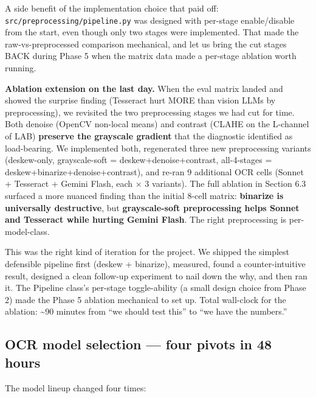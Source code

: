 \documentclass[
  letterpaper,
  DIV=11,
  numbers=noendperiod]{scrartcl}
\begin{document}
A side benefit of the implementation choice that paid off:
\texttt{src/preprocessing/pipeline.py} was designed with per-stage
enable/disable from the start, even though only two stages were
implemented. That made the raw-vs-preprocessed comparison mechanical,
and let us bring the cut stages BACK during Phase 5 when the matrix data
made a per-stage ablation worth running.

\textbf{Ablation extension on the last day.} When the eval matrix landed
and showed the surprise finding (Tesseract hurt MORE than vision LLMs by
preprocessing), we revisited the two preprocessing stages we had cut for
time. Both denoise (OpenCV non-local means) and contrast (CLAHE on the
L-channel of LAB) \textbf{preserve the grayscale gradient} that the
diagnostic identified as load-bearing. We implemented both, regenerated
three new preprocessing variants (deskew-only, grayscale-soft =
deskew+denoise+contrast, all-4-stages =
deskew+binarize+denoise+contrast), and re-ran 9 additional OCR cells
(Sonnet + Tesseract + Gemini Flash, each × 3 variants). The full
ablation in Section 6.3 surfaced a more nuanced finding than the initial
8-cell matrix: \textbf{binarize is universally destructive}, but
\textbf{grayscale-soft preprocessing helps Sonnet and Tesseract while
hurting Gemini Flash}. The right preprocessing is per-model-class.

This was the right kind of iteration for the project. We shipped the
simplest defensible pipeline first (deskew + binarize), measured, found
a counter-intuitive result, designed a clean follow-up experiment to
nail down the why, and then ran it. The Pipeline class's per-stage
toggle-ability (a small design choice from Phase 2) made the Phase 5
ablation mechanical to set up. Total wall-clock for the ablation:
\textasciitilde90 minutes from ``we should test this'' to ``we have the
numbers.''

\subsection{OCR model selection --- four pivots in 48
hours}\label{ocr-model-selection-four-pivots-in-48-hours}

The model lineup changed four times:
\end{document}
